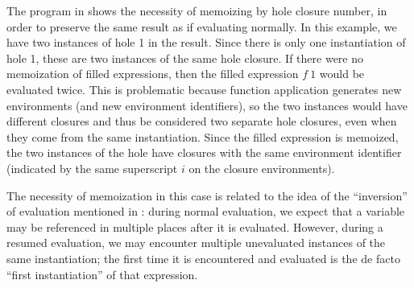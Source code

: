 The program in  shows the necessity of memoizing by hole closure number, in order to preserve the same result as if evaluating normally. In this example, we have two instances of hole 1 in the result. Since there is only one instantiation of hole 1, these are two instances of the same hole closure. If there were no memoization of filled expressions, then the filled expression $f\ 1$ would be evaluated twice. This is problematic because function application generates new environments (and new environment identifiers), so the two instances would have different closures and thus be considered two separate hole closures, even when they come from the same instantiation. Since the filled expression is memoized, the two instances of the hole have closures with the same environment identifier (indicated by the same superscript $i$ on the closure environments).

The necessity of memoization in this case is related to the idea of the ``inversion'' of evaluation mentioned in : during normal evaluation, we expect that a variable may be referenced in multiple places after it is evaluated. However, during a resumed evaluation, we may encounter multiple unevaluated instances of the same instantiation; the first time it is encountered and evaluated is the de facto ``first instantiation'' of that expression.

